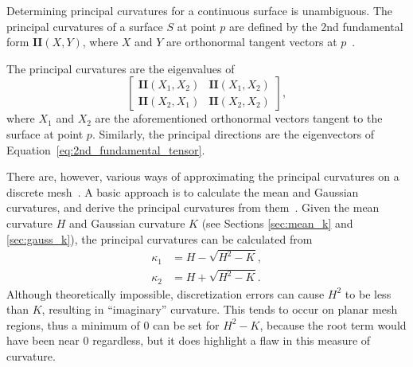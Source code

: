 Determining principal curvatures for a continuous surface is unambiguous.
The principal curvatures of a surface $S$ at point $p$ are defined by the 2nd fundamental form $\textbf{II}(X,Y)$, where $X$ and $Y$ are orthonormal tangent vectors at $p$~\cite{DiffGeo_curves_surfaces, Basic_diff_geo_of_surfaces, DDGAppIntro_17_smooth_k}.

The principal curvatures are the eigenvalues of
\begin{equation}\label{eq:2nd_fundamental_tensor}
	\begin{bmatrix}
		\textbf{II}(X_1, X_2) & \textbf{II}(X_1, X_2) \\
		\textbf{II}(X_2, X_1) & \textbf{II}(X_2, X_2)
	\end{bmatrix},
\end{equation}
where $X_1$ and $X_2$ are the aforementioned orthonormal vectors tangent to the surface at point $p$.
Similarly, the principal directions are the eigenvectors of Equation~\eqref{eq:2nd_fundamental_tensor}.

There are, however, various ways of approximating the principal curvatures on a discrete mesh~\cite{EstCurvOnTriMesh, DiscDiffGeoOpsTriMani}.
A basic approach is to calculate the mean and Gaussian curvatures, and derive the principal curvatures from them~\cite{DDGAppIntro_19_discrete_k_2, Gauss_mean_k_notes}.
Given the mean curvature $H$ and Gaussian curvature $K$ (see Sections \ref{sec:mean_k} and \ref{sec:gauss_k}), the principal curvatures can be calculated from
\begin{align*}
	\kappa_1 &= H - \sqrt{H^2 - K}, \\
	\kappa_2 &= H + \sqrt{H^2 - K}.
\end{align*}
Although theoretically impossible, discretization errors can cause $H^2$ to be less than $K$, resulting in ``imaginary'' curvature.
This tends to occur on planar mesh regions, thus a minimum of 0 can be set for $H^2 - K$, because the root term would have been near 0 regardless, but it does highlight a flaw in this measure of curvature.

